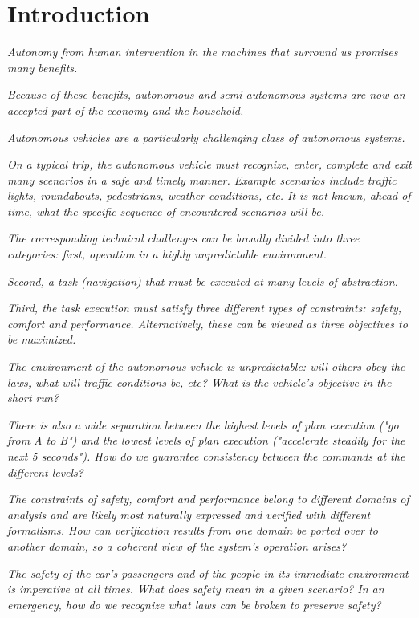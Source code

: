 \section{Introduction}
\label{introduction}

{\it Autonomy from human intervention in the machines that surround us promises many benefits.}

{\it Because of these benefits, autonomous and semi-autonomous systems are now an accepted part of the economy and the household.}

{\it Autonomous vehicles are a particularly challenging class of autonomous systems.}

{\it On a typical trip, the autonomous vehicle must recognize, enter, complete and exit many scenarios in a safe and timely manner. Example scenarios include traffic lights, roundabouts, pedestrians, weather conditions, etc. 
It is not known, ahead of time, what the specific sequence of encountered scenarios will be.}

{\it The corresponding technical challenges can be broadly divided into three categories: first, operation in a highly unpredictable environment. }

{\it Second, a task (navigation) that must be executed at many levels of abstraction.}

{\it Third, the task execution must satisfy three different types of constraints: safety, comfort and performance. Alternatively, these can be viewed as three objectives to be maximized.}

{\it The environment of the autonomous vehicle is unpredictable: will others obey the laws, what will traffic conditions be, etc? What is the vehicle's objective in the short run?}

{\it There is also a wide separation between the highest levels of plan execution ("go from A to B") and the lowest levels of plan execution ("accelerate steadily for the next 5 seconds"). How do we guarantee consistency between the commands at the different levels?}

{\it The constraints of safety, comfort and performance belong to different domains of analysis and are likely most naturally expressed and verified with different formalisms.
	How can verification results from one domain be ported over to another domain, so a coherent view of the system's operation arises?}

{\it The safety of the car's passengers and of the people in its immediate environment is imperative at all times. 
	What does safety mean in a given scenario?
	In an emergency, how do we recognize what laws can be broken to preserve safety?}

